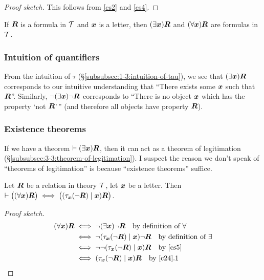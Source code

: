 \begin{proof}[Proof sketch]
This follows from \ref{cs2} and \ref{cs4}.
\end{proof}

\begin{cf}\label{cf11}%
If $\boldsymbol{R}$ is a formula in $\mathcal{T}$ and
$\boldsymbol{x}$ is a letter, then
$(\exists\boldsymbol{x})\boldsymbol{R}$ and
$(\forall\boldsymbol{x})\boldsymbol{R}$ are formulas in $\mathcal{T}$.
\end{cf}

\subsubsection{Intuition of quantifiers}
From the intuition of $\tau$ (\S\ref{subsubsec:1-3:intuition-of-tau}),
we see that $(\exists\boldsymbol{x})\boldsymbol{R}$ corresponds to
our intuitive understanding that ``There exists some $\boldsymbol{x}$
such that $\boldsymbol{R}$''. Similarly,
$\neg(\exists\boldsymbol{x})\neg\boldsymbol{R}$ corresponds to
``There is no object $\boldsymbol{x}$ which has the property `not
$\boldsymbol{R}$'\,'' (and therefore all objects have property
$\boldsymbol{R}$).

\subsubsection{Existence theorems}\label{subsubsec:4-1:existence-thms}
If we have a theorem $\vdash(\exists\boldsymbol{x})\boldsymbol{R}$,
then it can act as a theorem of legitimation
(\S\ref{subsubsec:3-3:theorem-of-legitimation}). I suspect the reason we
don't speak of ``theorems of legitimation'' is because ``existence
theorems'' suffice.

\begin{dc}\label{c26}%
Let $\boldsymbol{R}$ be a relation in theory $\mathcal{T}$, let
$\boldsymbol{x}$ be a letter. Then $\vdash\bigl((\forall\boldsymbol{x})\boldsymbol{R}\bigr)\iff\bigl((\tau_{\boldsymbol{x}}(\neg\boldsymbol{R})\mid\boldsymbol{x})\boldsymbol{R}\bigr)$.
\end{dc}

\begin{proof}[Proof sketch]
\begin{align*}
(\forall\boldsymbol{x})\boldsymbol{R} &\iff\neg(\exists\boldsymbol{x})\neg\boldsymbol{R}\quad\mbox{by definition of $\forall$}\\
&\iff\neg(\tau_{\boldsymbol{x}}(\neg\boldsymbol{R})\mid\boldsymbol{x})\neg\boldsymbol{R}\quad\mbox{by definition of $\exists$}\\
&\iff\neg\neg(\tau_{\boldsymbol{x}}(\neg\boldsymbol{R})\mid\boldsymbol{x})\boldsymbol{R}\quad\mbox{by \ref{cs5}}\\
&\iff(\tau_{\boldsymbol{x}}(\neg\boldsymbol{R})\mid\boldsymbol{x})\boldsymbol{R}\quad\mbox{by \ref{c24}.1}\qedhere
\end{align*}
\end{proof}

